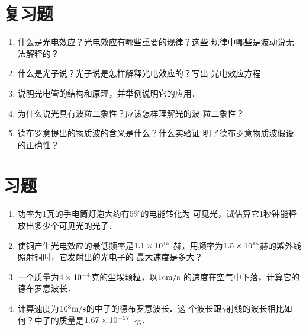 \section*{复习题}
\begin{enumerate}
\item 什么是光电效应？光电效应有哪些重要的规律？这些
规律中哪些是波动说无法解释的？
\item 什么是光子说？光子说是怎样解释光电效应的？写出
光电效应方程
\item 说明光电管的结构和原理，并举例说明它的应用．
\item 为什么说光具有波粒二象性？应该怎样理解光的波
粒二象性？
\item 德布罗意提出的物质波的含义是什么？什么实验证
明了德布罗意物质波假设的正确性？
\end{enumerate}

\section*{习题}
\begin{enumerate}
    \item 功率为1瓦的手电筒灯泡大约有5\%的电能转化为
可见光，试估算它1秒钟能释放出多少个可见光的光子．
\item 使铜产生光电效应的最低频率是$1.1\times10^{15}$
赫，用频率为$1.5\times10^{15}$赫的紫外线照射铜时，它发射出的光电子的
最大速度是多大？
\item 一个质量为$4\times10^{-4}$克的尘埃颗粒，以$1{\rm cm}/{\rm s}$
的速度在空气中下落，计算它的德布罗意波长．
\item 计算速度为$10^3\text{m}/\text{s}$的中子的德布罗意波长．这
个波长跟$\gamma$射线的波长相比如何？中子的质量是$1.67\times10^{-27}$
kg．
\end{enumerate}






















